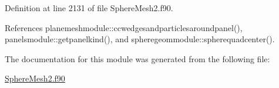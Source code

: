 Definition at line 2131 of file Sphere\+Mesh2.\+f90.



References planemeshmodule\+::ccwedgesandparticlesaroundpanel(), panelsmodule\+::getpanelkind(), and spheregeommodule\+::spherequadcenter().



The documentation for this module was generated from the following file\+:\begin{DoxyCompactItemize}
\item 
\hyperlink{SphereMesh2_8f90}{Sphere\+Mesh2.\+f90}\end{DoxyCompactItemize}
